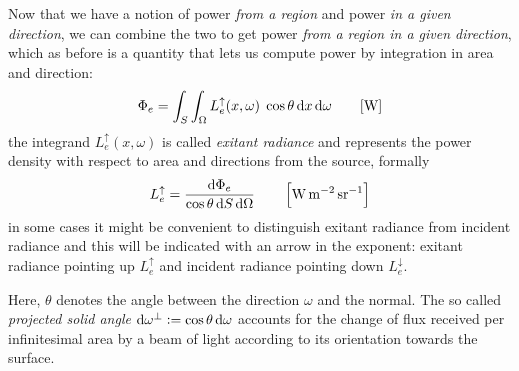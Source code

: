Now that we have a notion of power \textit{from a region} and power \textit{in
a given direction}, we can combine the two to get power \textit{from a region
in a given direction}, which as before is a quantity that lets us compute
power by integration in area and direction:
\begin{displaymath}
\Phi_e = \int_{S} \int_\Omega L_e^\uparrow(x, \omega) \;\cos\theta\d x\d\omega
\qquad [\unit{\watt}]
\end{displaymath}
the integrand $L_e^\uparrow(x, \omega)$ is called \textsl{exitant radiance}
and represents the power density with respect to area and directions from
the source, formally
\begin{displaymath}
L_e^\uparrow = \frac{\d\Phi_e}{\cos\theta \d S \d\Omega}
\qquad \left[\unit{\watt\per\square\meter\per\steradian}\right]
\end{displaymath}
in some cases it might be convenient to distinguish exitant radiance from
incident radiance and this will be indicated with an arrow in the exponent:
exitant radiance pointing up $L_e^\uparrow$ and incident radiance pointing down
$L_e^\downarrow$.

Here, $\theta$ denotes the angle between the direction $\omega$ and the normal.
The so called \emph{projected solid angle} $\mathop{}\!\mathrm{d}\omega^\bot := \cos \theta \mathop{}\!\mathrm{d} \omega$
accounts for the change of flux received per infinitesimal area by a beam of light
according to its orientation towards the surface.


